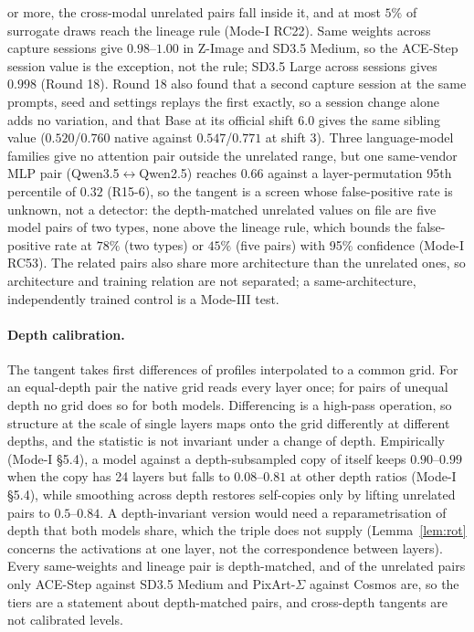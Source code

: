 \documentclass[11pt]{article}
\theoremstyle{definition}
\begin{document}
or more, the cross-modal unrelated pairs fall inside it, and at most $5\%$ of surrogate draws reach the lineage rule (Mode-I RC22). Same weights across capture sessions give $0.98$--$1.00$ in Z-Image and SD3.5 Medium, so the ACE-Step session value is the exception, not the rule; SD3.5 Large across sessions gives $0.998$ (Round 18). Round 18 also found that a second capture session at the same prompts, seed and settings replays the first exactly, so a session change alone adds no variation, and that Base at its official shift $6.0$ gives the same sibling value ($0.520$/$0.760$ native against $0.547$/$0.771$ at shift 3). Three language-model families give no attention pair outside the unrelated range, but one same-vendor MLP pair (Qwen3.5$\leftrightarrow$Qwen2.5) reaches $0.66$ against a layer-permutation 95th percentile of $0.32$ (R15-6), so the tangent is a screen whose false-positive rate is unknown, not a detector: the depth-matched unrelated values on file are five model pairs of two types, none above the lineage rule, which bounds the false-positive rate at $78\%$ (two types) or $45\%$ (five pairs) with 95\% confidence (Mode-I RC53). The related pairs also share more architecture than the unrelated ones, so architecture and training relation are not separated; a same-architecture, independently trained control is a Mode-III test.

\paragraph{Depth calibration.} The tangent takes first differences of profiles interpolated to a common grid. For an equal-depth pair the native grid reads every layer once; for pairs of unequal depth no grid does so for both models. Differencing is a high-pass operation, so structure at the scale of single layers maps onto the grid differently at different depths, and the statistic is not invariant under a change of depth. Empirically (Mode-I \S5.4), a model against a depth-subsampled copy of itself keeps $0.90$--$0.99$ when the copy has 24 layers but falls to $0.08$--$0.81$ at other depth ratios (Mode-I \S5.4), while smoothing across depth restores self-copies only by lifting unrelated pairs to $0.5$--$0.84$. A depth-invariant version would need a reparametrisation of depth that both models share, which the triple does not supply (Lemma~\ref{lem:rot} concerns the activations at one layer, not the correspondence between layers). Every same-weights and lineage pair is depth-matched, and of the unrelated pairs only ACE-Step against SD3.5 Medium and PixArt-$\Sigma$ against Cosmos are, so the tiers are a statement about depth-matched pairs, and cross-depth tangents are not calibrated levels.
\end{document}
